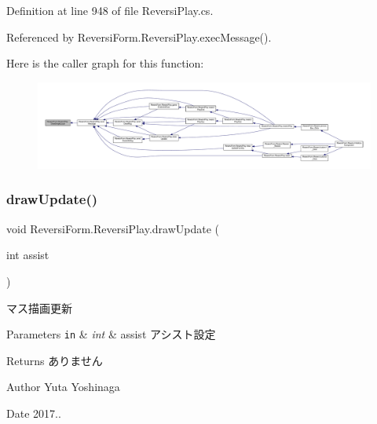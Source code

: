 Definition at line 948 of file Reversi\+Play.\+cs.



Referenced by Reversi\+Form.\+Reversi\+Play.\+exec\+Message().

Here is the caller graph for this function\+:\nopagebreak
\begin{figure}[H]
\begin{center}
\leavevmode
\includegraphics[width=350pt]{class_reversi_form_1_1_reversi_play_aa5bd95af33165d887efeed260b23ccb2_icgraph}
\end{center}
\end{figure}
\mbox{\label{class_reversi_form_1_1_reversi_play_af1415f15759ba8475b4b5afca3a35017}} 
\subsubsection{\texorpdfstring{draw\+Update()}{drawUpdate()}}
{\footnotesize\ttfamily void Reversi\+Form.\+Reversi\+Play.\+draw\+Update (\begin{DoxyParamCaption}\item[{int}]{assist }\end{DoxyParamCaption})}



マス描画更新 


\begin{DoxyParams}[1]{Parameters}
\mbox{\tt in}  & {\em int} & assist アシスト設定 \\
\hline
\end{DoxyParams}
\begin{DoxyReturn}{Returns}
ありません 
\end{DoxyReturn}
\begin{DoxyAuthor}{Author}
Yuta Yoshinaga 
\end{DoxyAuthor}
\begin{DoxyDate}{Date}
2017.. 
\end{DoxyDate}


